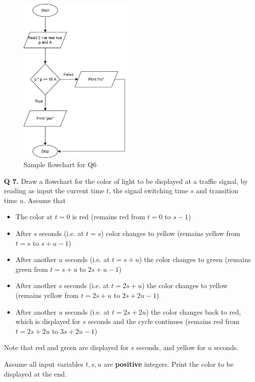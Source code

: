 \documentclass{article}
\begin{document}
\begin{figure}[ht]
    \centering
    \includegraphics[width=0.5\textwidth]{Q6.png}
    \caption{Sample flowchart for Q6}
    \label{Q6}
\end{figure}

\clearpage

\begin{flushleft}

\textbf{Q 7. } Draw a flowchart for the color of light to be displayed at a traffic signal, 
by reading as input the current time $t$, the signal switching time $s$ and transition time $u$. 
Assume that

\begin{itemize}
    \item The color at $t = 0$ is red 
          (remains red from $t=0$ to $s-1$)
    \item After $s$ seconds (i.e. at $t=s$) color changes to yellow
          (remains yellow from $t=s$ to $s+u-1$)
    \item After another $u$ seconds (i.e. at $t=s+u$)  the color changes to green
          (remains green from $t=s+u$ to $2s+u-1$)
    \item After another $s$ seconds (i.e. at $t=2s+u$) the color changes to yellow
          (remains yellow from $t=2s+u$ to $2s+2u-1$)
    \item After another $u$ seconds  (i.e. at $t=2s+2u$) the color changes back to red, 
          which is displayed for $s$ seconds and the cycle continues
          (remains red from $t=2s+2u$ to $3s+2u-1$)
\end{itemize}

Note that red and green are displayed for $s$ seconds, and yellow for $u$ seconds.

Assume all input variables $t, s, u$ are \textbf{positive} integers.
Print the color to be displayed at the end.

\end{flushleft}
\end{document}
